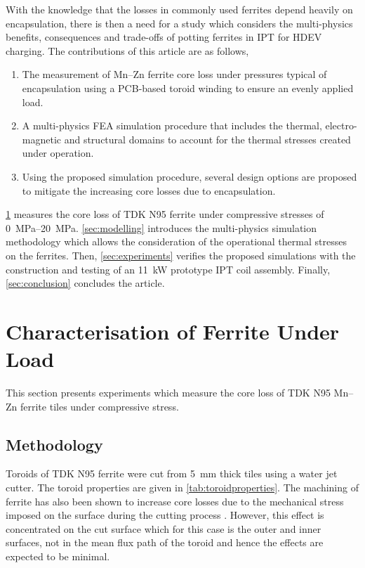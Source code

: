 \documentclass[conference]{IEEEtran}
\begin{document}
With the knowledge that the losses in commonly used ferrites depend heavily on encapsulation, there is then a need for a study which considers the multi-physics benefits, consequences and trade-offs of potting ferrites in IPT for HDEV charging. 
The contributions of this article are as follows, 
\begin{enumerate}
  \item The measurement of Mn--Zn ferrite core loss under pressures typical of encapsulation using a PCB-based toroid winding to ensure an evenly applied load. 
  \item A multi-physics FEA simulation procedure that includes the thermal, electro-magnetic and structural domains to account for the thermal stresses created under operation. 
  \item Using the proposed simulation procedure, several design options are proposed to mitigate the increasing core losses due to encapsulation. 
\end{enumerate}

\cref{sec:characterisation} measures the core loss of TDK N95 ferrite under compressive stresses of \SIrange{0}{20}{\mega\pascal}. 
\cref{sec:modelling} introduces the multi-physics simulation methodology which allows the consideration of the operational thermal stresses on the ferrites.
Then, \cref{sec:experiments} verifies the proposed simulations with the construction and testing of an \SI{11}{\kilo\watt} prototype IPT coil assembly. 
Finally, \cref{sec:conclusion} concludes the article. 

\section{Characterisation of Ferrite Under Load}
\label{sec:characterisation}

This section presents experiments which measure the core loss of TDK N95 Mn--Zn ferrite tiles under compressive stress. 

\subsection{Methodology}

Toroids of TDK N95 ferrite were cut from \SI{5}{\milli\meter} thick tiles using a water jet cutter. 
The toroid properties are given in \cref{tab:toroidproperties}.
The machining of ferrite has also been shown to increase core losses due to the mechanical stress imposed on the surface during the cutting process \cite{neumayrOriginQuantificationIncreased2019}. 
However, this effect is concentrated on the cut surface which for this case is the outer and inner surfaces, not in the mean flux path of the toroid and hence the effects are expected to be minimal. 
\end{document}
